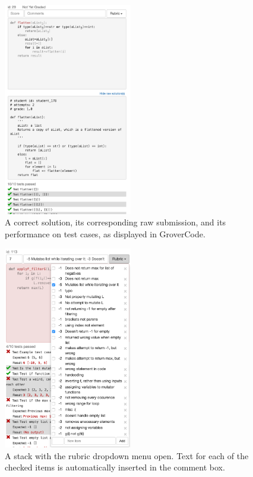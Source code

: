 \begin{figure}
\centering
\includegraphics[width=0.5\textwidth]{Body/figures/grovercode/figure_2}
\caption{A correct solution, its corresponding raw submission, and its performance on test cases, as displayed in GroverCode.}
\label{fig:correct_stack}
\end{figure}
 
\begin{figure}
\centering
\includegraphics[width=0.5\textwidth]{Body/figures/grovercode/figure_3}
\caption{A stack with the rubric dropdown menu open. Text for each of the checked items is automatically inserted in the comment box.}
\label{fig:rubric}
\end{figure}


